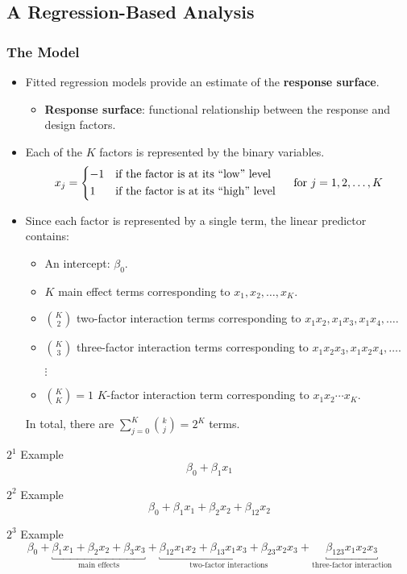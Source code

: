 \subsection{A Regression-Based Analysis}
\subsubsection*{The Model}
\begin{itemize}
    \item Fitted regression models provide an estimate of the \textbf{response surface}.
          \begin{itemize}[$\hookrightarrow$]
              \item \textbf{Response surface}: functional relationship between the response and design factors.
          \end{itemize}
    \item Each of the $K$ factors is represented by the binary variables.
          \[ x_j=\begin{cases*}
                  -1 & if the factor is at its ``low'' level  \\
                  1  & if the factor is at its ``high'' level
              \end{cases*}\quad \text{for }j=1,2,\ldots,K \]
    \item Since each factor is represented by a single term, the linear predictor contains:
          \begin{itemize}
              \item An intercept: $ \beta_0 $.
              \item $ K $ main effect terms corresponding to $ x_1,x_2,\ldots,x_K $.
              \item $ \binom{K}{2} $ two-factor interaction terms corresponding to $ x_1x_2,x_1x_3,x_1x_4,\ldots $.
              \item $ \binom{K}{3} $ three-factor interaction terms corresponding to $ x_1x_2x_3,x_1x_2x_4,\ldots $.
              \item[$\vdots$]
              \item $ \binom{K}{K}=1 $ $ K $-factor interaction term corresponding to $ x_1x_2\cdots x_K $.
          \end{itemize}
          In total, there are $ \sum_{j=0}^{K} \binom{k}{j}=2^K $ terms.
\end{itemize}
\begin{Example}{$ 2^1 $ Example}{}
    \[ \beta_0+\beta_1x_1 \]
\end{Example}
\begin{Example}{$ 2^2 $ Example}{}
    \[ \beta_0+\beta_1x_1+\beta_2x_2+\beta_{12}x_2 \]
\end{Example}
\begin{Example}{$ 2^3 $ Example}{}
    \[ \beta_0+\underbracket{\beta_1x_1+\beta_2x_2+\beta_3x_3}_{\text{main effects}}+
        \underbracket{\beta_{12}x_1x_2+\beta_{13}x_1x_3+\beta_{23}x_2x_3}_{\text{two-factor interactions}}+
        \underbracket{\beta_{123}x_1x_2x_3}_{\text{three-factor interaction}} \]
\end{Example}
